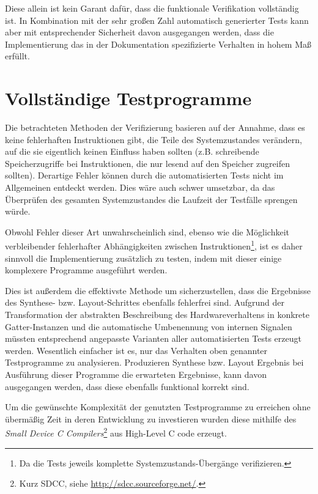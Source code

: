 \documentclass[ngerman, cd=lightcolor]{tudscrreprt}
\begin{document}
\noindent
Diese allein ist kein Garant dafür, dass die funktionale Verifikation
vollständig ist. In Kombination mit der sehr großen Zahl automatisch
generierter Tests kann aber mit entsprechender Sicherheit davon ausgegangen
werden, dass die Implementierung das in der Dokumentation spezifizierte
Verhalten in hohem Maß erfüllt.

\section{Vollständige Testprogramme}

Die betrachteten Methoden der Verifizierung basieren auf der Annahme, dass es
keine fehlerhaften Instruktionen gibt, die Teile des Systemzustandes verändern,
auf die sie eigentlich keinen Einfluss haben sollten (z.B. schreibende
Speicherzugriffe bei Instruktionen, die nur lesend auf den Speicher zugreifen
sollten). Derartige Fehler können durch die automatisierten Tests nicht im
Allgemeinen entdeckt werden. Dies wäre auch schwer umsetzbar, da das Überprüfen
des gesamten Systemzustandes die Laufzeit der Testfälle sprengen würde.

Obwohl Fehler dieser Art unwahrscheinlich sind, ebenso wie die Möglichkeit
verbleibender fehlerhafter Abhängigkeiten zwischen Instruktionen\footnote{Da
die Tests jeweils komplette Systemzustands-Übergänge verifizieren.}, ist es
daher sinnvoll die Implementierung zusätzlich zu testen, indem mit dieser
einige komplexere Programme ausgeführt werden.

Dies ist außerdem die effektivste Methode um sicherzustellen, dass die
Ergebnisse des Synthese- bzw. Layout-Schrittes ebenfalls fehlerfrei sind.
Aufgrund der Transformation der abstrakten Beschreibung des Hardwareverhaltens
in konkrete Gatter-Instanzen und die automatische Umbenennung von internen
Signalen müssten entsprechend angepasste Varianten aller automatisierten Tests
erzeugt werden. Wesentlich einfacher ist es, nur das Verhalten oben genannter
Testprogramme zu analysieren. Produzieren Synthese bzw. Layout Ergebnis bei
Ausführung dieser Programme die erwarteten Ergebnisse, kann davon ausgegangen
werden, dass diese ebenfalls funktional korrekt sind.

Um die gewünschte Komplexität der genutzten Testprogramme zu erreichen ohne
übermäßig Zeit in deren Entwicklung zu investieren wurden diese mithilfe des
\textit{Small Device C Compilers}\footnote{Kurz SDCC, siehe
\url{http://sdcc.sourceforge.net/}.} aus High-Level C code erzeugt.
\end{document}
